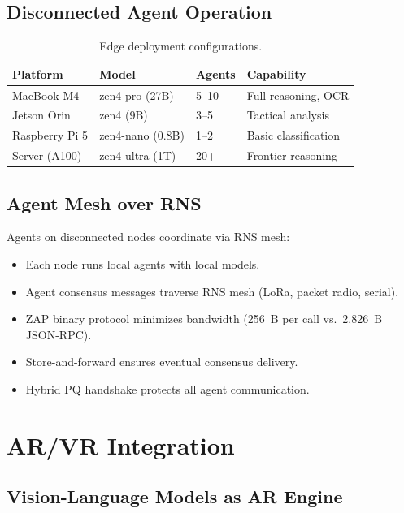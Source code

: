 \documentclass[11pt,letterpaper]{article}
\begin{document}
\subsection{Disconnected Agent Operation}

\begin{table}[H]
\centering
\begin{tabular}{@{}llll@{}}
\toprule
\textbf{Platform} & \textbf{Model} & \textbf{Agents} & \textbf{Capability} \\
\midrule
MacBook M4 & zen4-pro (27B) & 5--10 & Full reasoning, OCR \\
Jetson Orin & zen4 (9B) & 3--5 & Tactical analysis \\
Raspberry Pi 5 & zen4-nano (0.8B) & 1--2 & Basic classification \\
Server (A100) & zen4-ultra (1T) & 20+ & Frontier reasoning \\
\bottomrule
\end{tabular}
\caption{Edge deployment configurations.}
\label{tab:edge-deploy}
\end{table}

\subsection{Agent Mesh over RNS}

Agents on disconnected nodes coordinate via RNS mesh:

\begin{itemize}
\item Each node runs local agents with local models.
\item Agent consensus messages traverse RNS mesh (LoRa, packet radio, serial).
\item ZAP binary protocol minimizes bandwidth (256~B per call vs.\ 2,826~B JSON-RPC).
\item Store-and-forward ensures eventual consensus delivery.
\item Hybrid PQ handshake protects all agent communication.
\end{itemize}

\section{AR/VR Integration}

\subsection{Vision-Language Models as AR Engine}
\end{document}
